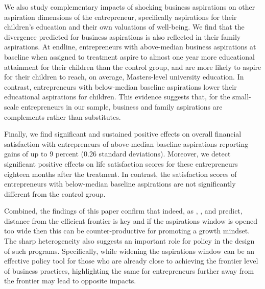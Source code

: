 \documentclass[11.5pt]{article}
\begin{document}
We also study complementary impacts of shocking business aspirations on other aspiration dimensions of the entrepreneur, specifically aspirations for their children's education and their own valuations of well-being. We find that the divergence predicted for business aspirations is also reflected in their family aspirations. At endline, entrepreneurs with above-median business aspirations at baseline when assigned to treatment aspire to almost one year more educational attainment for their children than the control group, and are more likely to aspire for their children to reach, on average, Masters-level university education. In contrast, entrepreneurs with below-median baseline aspirations lower their educational aspirations for children. This evidence suggests that, for the small-scale entrepreneurs in our sample, business and family aspirations are complements rather than substitutes.

Finally, we find significant and sustained positive effects on overall financial satisfaction with entrepreneurs of above-median baseline aspirations reporting gains of up to 9 percent (0.26 standard deviations). Moreover, we detect significant positive effects on life satisfaction scores for these entrepreneurs eighteen months after the treatment. In contrast, the satisfaction scores of entrepreneurs with below-median baseline aspirations are not significantly different from the control group.

Combined, the findings of this paper confirm that indeed, as \citet{Ray2006}, \citet{Dalton2016}, and \citet{Genicot2017} predict, distance from the efficient frontier is key and if the aspirations window is opened too wide then this can be counter-productive for promoting a growth mindset. The sharp heterogeneity also suggests an important role for policy in the design of such programs. Specifically, while widening the aspirations window can be an effective policy tool for those who are already close to achieving the frontier level of business practices, highlighting the same for entrepreneurs further away from the frontier may lead to opposite impacts.
\end{document}

